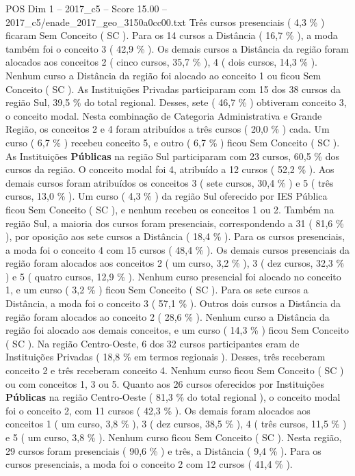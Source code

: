 \begin{textsample}{POS Dim 1 – 2017\_c5 – Score 15.00 – 2017\_c5/enade\_2017\_geo\_3150a0cc00.txt}
Três cursos presenciais ( 4,3 \% ) ficaram Sem Conceito ( SC ).
Para os 14 cursos a Distância ( 16,7 \% ), a moda também foi o conceito 3 ( 42,9 \% ).
Os demais cursos a Distância da região foram alocados aos conceitos 2 ( cinco cursos, 35,7 \% ), 4 ( dois cursos, 14,3 \% ).
Nenhum curso a Distância da região foi alocado ao conceito 1 ou ficou Sem Conceito ( SC ).
As Instituições Privadas participaram com 15 dos 38 cursos da região Sul, 39,5 \% do total regional.
Desses, sete ( 46,7 \% ) obtiveram conceito 3, o conceito modal.
Nesta combinação de Categoria Administrativa e Grande Região, os conceitos 2 e 4 foram atribuídos a três cursos ( 20,0 \% ) cada.
Um curso ( 6,7 \% ) recebeu conceito 5, e outro ( 6,7 \% ) ficou Sem Conceito ( SC ).
As Instituições \textbf{Públicas} na região Sul participaram com 23 cursos, 60,5 \% dos cursos da região.
O conceito modal foi 4, atribuído a 12 cursos ( 52,2 \% ).
Aos demais cursos foram atribuídos os conceitos 3 ( sete cursos, 30,4 \% ) e 5 ( três cursos, 13,0 \% ).
Um curso ( 4,3 \% ) da região Sul oferecido por IES Pública ficou Sem Conceito ( SC ), e nenhum recebeu os conceitos 1 ou 2.
Também na região Sul, a maioria dos cursos foram presenciais, correspondendo a 31 ( 81,6 \% ), por oposição aos sete cursos a Distância ( 18,4 \% ).
Para os cursos presenciais, a moda foi o conceito 4 com 15 cursos ( 48,4 \% ).
Os demais cursos presenciais da região foram alocados aos conceitos 2 ( um curso, 3,2 \% ), 3 ( dez cursos, 32,3 \% ) e 5 ( quatro cursos, 12,9 \% ).
Nenhum curso presencial foi alocado no conceito 1, e um curso ( 3,2 \% ) ficou Sem Conceito ( SC ).
Para os sete cursos a Distância, a moda foi o conceito 3 ( 57,1 \% ).
Outros dois cursos a Distância da região foram alocados ao conceito 2 ( 28,6 \% ).
Nenhum curso a Distância da região foi alocado aos demais conceitos, e um curso ( 14,3 \% ) ficou Sem Conceito ( SC ).
Na região Centro-Oeste, 6 dos 32 cursos participantes eram de Instituições Privadas ( 18,8 \% em termos regionais ).
Desses, três receberam conceito 2 e três receberam conceito 4.
Nenhum curso ficou Sem Conceito ( SC ) ou com conceitos 1, 3 ou 5.
Quanto aos 26 cursos oferecidos por Instituições \textbf{Públicas} na região Centro-Oeste ( 81,3 \% do total regional ), o conceito modal foi o conceito 2, com 11 cursos ( 42,3 \% ).
Os demais foram alocados aos conceitos 1 ( um curso, 3,8 \% ), 3 ( dez cursos, 38,5 \% ), 4 ( três cursos, 11,5 \% ) e 5 ( um curso, 3,8 \% ).
Nenhum curso ficou Sem Conceito ( SC ).
Nesta região, 29 cursos foram presenciais ( 90,6 \% ) e três, a Distância ( 9,4 \% ).
Para os cursos presenciais, a moda foi o conceito 2 com 12 cursos ( 41,4 \% ).

\end{textsample}
